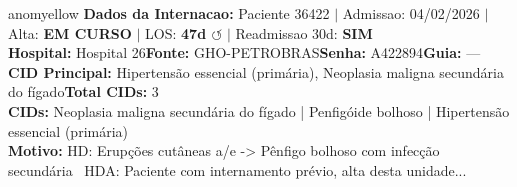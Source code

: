 \documentclass[a4paper,10pt]{article}
\begin{document}
\begin{anomalycard}[Internacao 164473 | GHO-PETROBRAS | MODERADO (z=2.53)]{anomyellow}
\textbf{Dados da Internacao:} Paciente 36422 $\mid$ Admissao: 04/02/2026 $\mid$ Alta: \textcolor{anomorange}{\textbf{EM CURSO}} $\mid$ LOS: \textbf{47d \textcolor{anomorange}{$\circlearrowleft$}} $\mid$ Readmissao 30d: \textcolor{anomred}{\textbf{SIM}}\\
\textbf{Hospital:} Hospital 26\quad\textbf{Fonte:} GHO-PETROBRAS\quad\textbf{Senha:} A422894\quad\textbf{Guia:} ---\\
\textbf{CID Principal:} {\small Hipertensão essencial (primária), Neoplasia maligna secundária do fígado}\quad\textbf{Total CIDs:} 3\\

\textbf{CIDs:} {\scriptsize Neoplasia maligna secundária do fígado | Penfigóide bolhoso | Hipertensão essencial (primária)}\\

\textbf{Motivo:} {\scriptsize HD: Erupções cutâneas a/e -> Pênfigo bolhoso com infecção secundária   HDA: Paciente com internamento prévio, alta desta unidade...}\\


\end{anomalycard}
\end{document}
